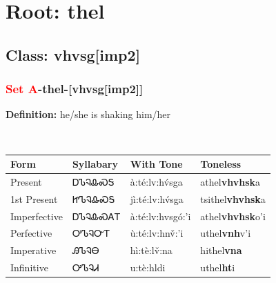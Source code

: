 \needspace{4in}
\section*{Root: thel}
\nopagebreak
{}
\needspace{3in}
\subsection*{Class: vhvsg[imp2]}
\nopagebreak
\needspace{2in}
\subsubsection*{\textcolor{Red}{Set A}{-}\textbf{thel}{-}[vhvsg[imp2]]}
\nopagebreak
\textbf{Definition: } he/she is shaking him/her
\\[0.5em]
\begin{tabularx}{\textwidth}{l X X X}%
\toprule%
\textbf{Form}&\textbf{Syllabary}&\textbf{With Tone}&\textbf{Toneless}\\%
\midrule%
Present&ᎠᏖᎸᎲᏍᎦ&à:té:lv:hv́sga&athel\textbf{vhvhsk}a\\%
1st Present&ᏥᏖᎸᎲᏍᎦ&jì:té:lv:hv́sga&tsithel\textbf{vhvhsk}a\\%
Imperfective&ᎠᏖᎸᎲᏍᎪᎢ&à:té:lv:hvsgó:’i&athel\textbf{vhvhsk}o'i\\%
Perfective&ᎤᏖᎸᏅᎢ&ù:té:lv:hnv̌:’i&uthel\textbf{vnh}v'i\\%
Imperative&ᎯᏖᎸᎾ&hì:tè:lv̌:na&hithel\textbf{vna}\\%
Infinitive&ᎤᏖᎸᏗ&u:tè:hldi&uthel\textbf{ht}i\\%
\bottomrule%
\end{tabularx}
\\[1em]